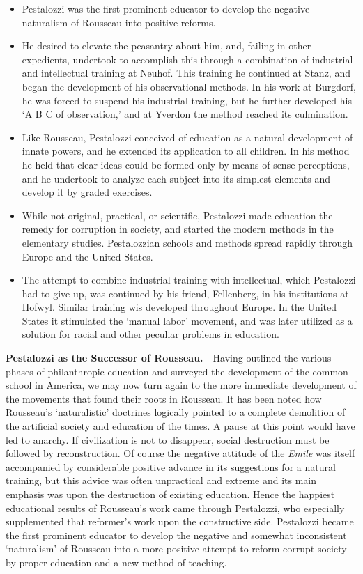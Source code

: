 \documentclass[
]{book}
\providecommand{\tightlist}{%
  \setlength{\itemsep}{0pt}\setlength{\parskip}{0pt}}
\begin{document}
\begin{itemize}
\tightlist
\item
  Pestalozzi was the first prominent educator to develop the negative naturalism of Rousseau into positive reforms.
\item
  He desired to elevate the peasantry about him, and, failing in other expedients, undertook to accomplish this through a combination of industrial and intellectual training at Neuhof. This training he continued at Stanz, and began the development of his observational methods. In his work at Burgdorf, he was forced to suspend his industrial training, but he further developed his `A B C of observation,' and at Yverdon the method reached its culmination.
\item
  Like Rousseau, Pestalozzi conceived of education as a natural development of innate powers, and he extended its application to all children. In his method he held that clear ideas could be formed only by means of sense perceptions, and he undertook to analyze each subject into its simplest elements and develop it by graded exercises.
\item
  While not original, practical, or scientific, Pestalozzi made education the remedy for corruption in society, and started the modern methods in the elementary studies. Pestalozzian schools and methods spread rapidly through Europe and the United States.
\item
  The attempt to combine industrial training with intellectual, which Pestalozzi had to give up, was continued by his friend, Fellenberg, in his institutions at Hofwyl. Similar training wis developed throughout Europe. In the United States it stimulated the `manual labor' movement, and was later utilized as a solution for racial and other peculiar problems in education.
\end{itemize}

\textbf{Pestalozzi as the Successor of Rousseau.} - Having outlined the various phases of philanthropic education and surveyed the development of the common school in America, we may now turn again to the more immediate development of the movements that found their roots in Rousseau. It has been noted how Rousseau's `naturalistic' doctrines logically pointed to a complete demolition of the artificial society and education of the times. A pause at this point would have led to anarchy. If civilization is not to disappear, social destruction must be followed by reconstruction. Of course the negative attitude of the \emph{Emile} was itself accompanied by considerable positive advance in its suggestions for a natural training, but this advice was often unpractical and extreme and its main emphasis was upon the destruction of existing education. Hence the happiest educational results of Rousseau's work came through Pestalozzi, who especially supplemented that reformer's work upon the constructive side. Pestalozzi became the first prominent educator to develop the negative and somewhat inconsistent `naturalism' of Rousseau into a more positive attempt to reform corrupt society by proper education and a new method of teaching.
\end{document}
